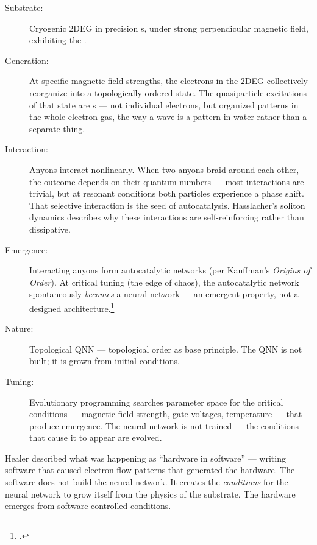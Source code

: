 \begin{description}
\item[Substrate:] Cryogenic 2DEG in precision s, under strong perpendicular magnetic field, exhibiting the .

\item[Generation:] At specific magnetic field strengths, the electrons in the 2DEG collectively reorganize into a topologically ordered state. The quasiparticle excitations of that state are s --- not individual electrons, but organized patterns in the whole electron gas, the way a wave is a pattern in water rather than a separate thing.

\item[Interaction:] Anyons interact nonlinearly. When two anyons braid around each other, the outcome depends on their quantum numbers --- most interactions are trivial, but at resonant conditions both particles experience a phase shift. That selective interaction is the seed of autocatalysis. Hasslacher's soliton dynamics describes why these interactions are self-reinforcing rather than dissipative.

\item[Emergence:] Interacting anyons form autocatalytic networks (per Kauffman's \textit{Origins of Order}). At critical tuning (the edge of chaos), the autocatalytic network spontaneously \textit{becomes} a neural network --- an emergent property, not a designed architecture.\footcite{kauffman1993}

\item[Nature:] Topological QNN --- topological order as base principle. The QNN is not built; it is grown from initial conditions.

\item[Tuning:] Evolutionary programming searches parameter space for the critical conditions --- magnetic field strength, gate voltages, temperature --- that produce emergence. The neural network is not trained --- the conditions that cause it to appear are evolved.
\end{description}

Healer described what was happening as ``hardware in software'' --- writing software that caused electron flow patterns that generated the hardware. The software does not build the neural network. It creates the \textit{conditions} for the neural network to grow itself from the physics of the substrate. The hardware emerges from software-controlled conditions.

